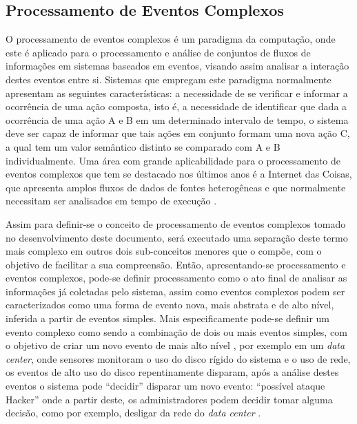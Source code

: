 \documentclass[ti,table]{texufpel} %
\begin{document}
  

  


  

\subsection{Processamento de Eventos Complexos} 

O processamento de eventos complexos é um paradigma da computação, onde este é aplicado para o processamento e análise de conjuntos de fluxos de informações em sistemas baseados em eventos, visando assim analisar a interação destes eventos entre si. Sistemas que empregam este paradigma normalmente apresentam as seguintes características: a necessidade de se verificar e informar a ocorrência de uma ação composta, isto é, a necessidade de identificar que dada a ocorrência de uma ação A e B em um determinado intervalo de tempo, o sistema deve ser capaz de informar que tais ações em conjunto formam uma nova ação C, a qual tem um valor semântico distinto se comparado com A e B individualmente. Uma área com grande aplicabilidade para o processamento de eventos complexos que tem se destacado nos últimos anos é a Internet das Coisas, que apresenta amplos fluxos de dados de fontes heterogêneas e que normalmente necessitam ser analisados em tempo de execução \cite{jun2014design}.  

  

Assim para definir-se o conceito de processamento de eventos complexos tomado no desenvolvimento deste documento, será executado uma separação deste termo mais complexo em outros dois sub-conceitos menores que o compõe, com o objetivo de facilitar a sua compreensão. Então, apresentando-se processamento e eventos complexos, pode-se definir processamento como o ato final de analisar as informações já coletadas pelo sistema, assim como eventos complexos podem ser caracterizados como uma forma de evento nova, mais abstrata e de alto nível, inferida a partir de eventos simples. Mais especificamente pode-se definir um evento complexo como sendo a combinação de dois ou mais eventos simples, com o objetivo de criar um novo evento de mais alto nível \cite{dayarathna2018recent}, por exemplo em um \textit{data center}, onde sensores monitoram o uso do disco rígido do sistema e o uso de rede, os eventos de alto uso do disco repentinamente disparam, após a análise destes eventos o sistema pode ``decidir'' disparar um novo evento: ``possível ataque Hacker'' onde a partir deste, os administradores podem decidir tomar alguma decisão, como por exemplo, desligar da rede do \textit{data center} \cite{wu2006high}.  
\end{document}
